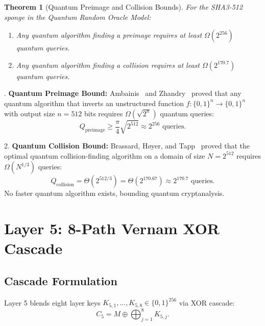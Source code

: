 \documentclass{ieeeaccess}
\newtheorem{theorem}{Theorem}
\newenvironment{proof}{\begin{IEEEproof}\IEEEQEDoff}{\end{IEEEproof}}
\begin{document}
\begin{theorem}[Quantum Preimage and Collision Bounds]
\label{thm:L4-quantum}
For the SHA3-512 sponge in the Quantum Random Oracle Model:
\begin{enumerate}
  \item Any quantum algorithm finding a preimage requires at least $\Omega(2^{256})$ quantum queries.
  \item Any quantum algorithm finding a collision requires at least $\Omega(2^{170.7})$ quantum queries.
\end{enumerate}
\end{theorem}
\begin{proof}
1. \textbf{Quantum Preimage Bound:} Ambainis~\cite{Ambainis2005} and Zhandry~\cite{Zhandry2012} proved that any quantum algorithm that inverts an unstructured function $f : \{0,1\}^n \to \{0,1\}^n$ with output size $n=512$ bits requires $\Omega(\sqrt{2^n})$ quantum queries:
\begin{equation}
  Q_{\mathrm{preimage}} \geq \frac{\pi}{4} \sqrt{2^{512}} \approx 2^{256} \text{ queries}.
\end{equation}

2. \textbf{Quantum Collision Bound:} Brassard, H{\o}yer, and Tapp~\cite{BrassardHT1998} proved that the optimal quantum collision-finding algorithm on a domain of size $N = 2^{512}$ requires $\Omega(N^{1/3})$ queries:
\begin{equation}
  Q_{\mathrm{collision}} = \Theta(2^{512/3}) = \Theta(2^{170.67}) \approx 2^{170.7} \text{ queries}.
\end{equation}
No faster quantum algorithm exists, bounding quantum cryptanalysis.
\end{proof}

\section{Layer 5: 8-Path Vernam XOR Cascade}
\label{sec:L5}

\subsection{Cascade Formulation}
Layer 5 blends eight layer keys $K_{5,1}, \dots, K_{5,8} \in \{0,1\}^{256}$ via XOR cascade:
\begin{equation}
  C_5 = M \oplus \bigoplus_{j=1}^8 K_{5,j}.
  \label{eq:vernam-cascade}
\end{equation}
\end{document}

